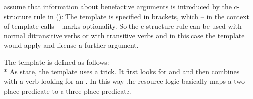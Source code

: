 \citet*[]{AGT2014a} assume that information about benefactive arguments is introduced by the
c-structure rule in ():
\ea\label{c-struc-vp-benefactive}
\z
The  template is specified in brackets, which -- in the context of template calls -- marks optionality. So the
c-structure rule can be used with normal ditransitive verbs or with transitive verbs and in this
case the  template would apply and license a further argument.

The  template is defined as follows:
\ea
    {\tempeq}\\*
\z
As \citet[]{AGT2014a} state, the template uses a trick. It first looks for  and
 and then combines with a verb looking for an . In this way the resource
logic basically maps a two-place predicate to a three-place predicate.

